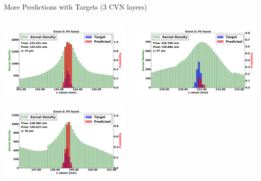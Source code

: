 \begin{frame}{More Predictions with Targets (3 CVN layers)}
  \begin{columns}[c]
        \begin{center}
            \includegraphics[width=1\textwidth,height=0.45\textwidth, trim=18 0 18 0]{images/120000_3layer_40.pdf}
    
            \includegraphics[width=1\textwidth, height=0.45\textwidth,trim=18 0 18 0]{images/120000_3layer_41.pdf}

        \end{center}
        \begin{center}
           \includegraphics[width=1\textwidth, height=0.45\textwidth, trim=18 0 18 0]{images/120000_3layer_42.pdf}
    

\end{center}
\end{columns}
\end{frame}
